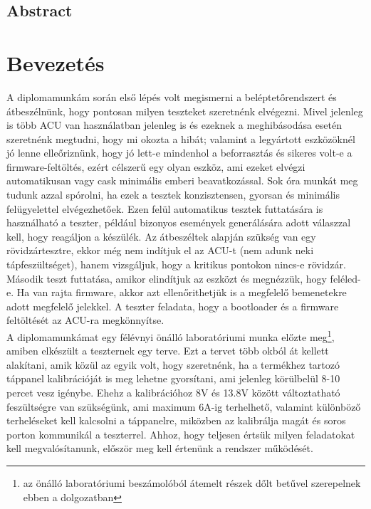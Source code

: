 \documentclass[a4paper, 12pt]{article}
\newcommand{\tab}{\hspace*{1em}}
\begin{document}
\thispagestyle{empty} %
\clearpage

\begin{otherlanguage}{english}

\section*{Abstract}


\end{otherlanguage}
\thispagestyle{empty} %
\clearpage


\section{Bevezetés}
\tab A diplomamunkám során első lépés volt megismerni a beléptetőrendszert és átbeszélnünk, hogy pontosan milyen teszteket szeretnénk elvégezni. Mivel jelenleg is több ACU van használatban jelenleg is és ezeknek a meghibásodása esetén szeretnénk megtudni, hogy mi okozta a hibát; valamint a legyártott eszközöknél jó lenne elleőriznünk, hogy jó lett-e mindenhol a beforrasztás és sikeres volt-e a firmware-feltöltés, ezért célszerű egy olyan eszköz, ami ezeket elvégzi automatikusan vagy cask minimális emberi beavatkozással. Sok óra munkát meg tudunk azzal spórolni, ha ezek a tesztek konzisztensen, gyorsan és minimális felügyelettel elvégezhetőek. Ezen felül automatikus tesztek futtatására is használható a teszter, például bizonyos események generálására adott válaszzal kell, hogy reagáljon a készülék. Az átbeszéltek alapján szükség van egy rövidzártesztre, ekkor még nem indítjuk el az ACU-t (nem adunk neki tápfeszültséget), hanem vizsgáljuk, hogy a kritikus pontokon nincs-e rövidzár. Második teszt futtatása, amikor elindítjuk az eszközt és megnézzük, hogy feléled-e. Ha van rajta firmware, akkor azt ellenőrithetjük is a megfelelő bemenetekre adott megfelelő jelekkel. A teszter feladata, hogy a bootloader és a firmware feltöltését az ACU-ra megkönnyítse. \\
A diplomamunkámat egy félévnyi önálló laboratóriumi munka előzte meg\footnote{az önálló laboratóriumi beszámolóból átemelt részek dőlt betűvel szerepelnek ebben a dolgozatban}, amiben elkészült a teszternek egy terve. Ezt a tervet több okból át kellett alakítani, amik közül az egyik volt, hogy szeretnénk, ha a termékhez tartozó táppanel kalibrációját is meg lehetne gyorsítani, ami jelenleg körülbelül 8-10 percet vesz igénybe. Ehehz a kalibrációhoz 8V és 13.8V között változtatható feszültségre van szükségünk, ami maximum 6A-ig terhelhető, valamint különböző terheléseket kell kalcsolni a táppanelre, miközben az kalibrálja magát és soros porton kommunikál a teszterrel. Ahhoz, hogy teljesen értsük milyen feladatokat kell megvalósítanunk, először meg kell értenünk a rendszer működését.
\end{document}

